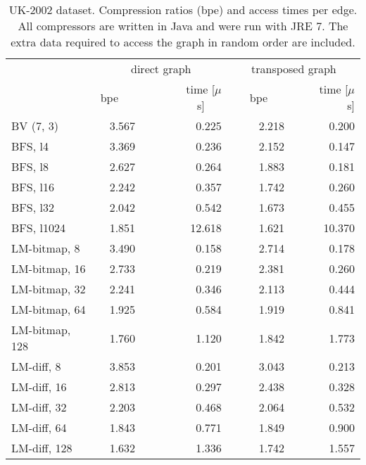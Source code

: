 \documentclass[envcountsame]{llncs}
\begin{document}
\begin{table}
\centering
\begin{tabular}{lrrrr}
\hline
        & \multicolumn{2}{c}{direct graph} & \multicolumn{2}{c}{transposed graph} \\
\cline{2-5}
        &  bpe~~~&~~~time [$\mu$s]~~~&~~~bpe~~~&~~~time [$\mu$s] \\
\hline
BV (7, 3) & 3.567 & 0.225 & 2.218 & 0.200 \\
BFS, l4 & 3.369 & 0.236 & 2.152 & 0.147 \\
BFS, l8 & 2.627 & 0.264 & 1.883 & 0.181 \\
BFS, l16 & 2.242 & 0.357 & 1.742 & 0.260 \\
BFS, l32 & 2.042 & 0.542 & 1.673 & 0.455 \\
BFS, l1024 & 1.851 & 12.618 & 1.621 & 10.370 \\
LM-bitmap, 8 & 3.490 & 0.158 & 2.714 & 0.178 \\
LM-bitmap, 16 & 2.733 & 0.219 & 2.381 & 0.260 \\
LM-bitmap, 32 & 2.241 & 0.346 & 2.113 & 0.444 \\
LM-bitmap, 64 & 1.925 & 0.584 & 1.919 & 0.841 \\
LM-bitmap, 128 & 1.760 & 1.120 & 1.842 & 1.773 \\
LM-diff, 8 & 3.853 & 0.201 & 3.043 & 0.213 \\
LM-diff, 16 & 2.813 & 0.297 & 2.438 & 0.328 \\
LM-diff, 32 & 2.203 & 0.468 & 2.064 & 0.532 \\
LM-diff, 64 & 1.843 & 0.771 & 1.849 & 0.900 \\
LM-diff, 128 & 1.632 & 1.336 & 1.742 & 1.557 \\

\hline
\end{tabular}
\vspace{4mm}
\caption{UK-2002 dataset. Compression ratios (bpe) and access times per edge. 
All compressors are written in Java and were run with JRE 7.
The extra data required to access the graph in random order are included.
}
\label{table:app_uk}
\end{table}
\end{document}
